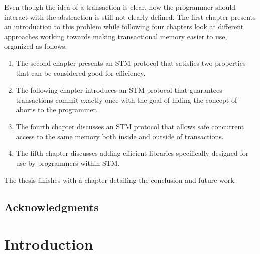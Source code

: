 \documentclass[11pt]{book}
\begin{document}
Even though the idea of a transaction is clear, how the programmer should interact with the
abstraction is still not clearly defined.
The first chapter presents an introduction to this problem
while following four chapters look at different approaches working towards
making transactional memory easier to use, organized as follows:
\begin{enumerate}
\item The second chapter presents an STM protocol that satisfies two properties that can be considered good for efficiency.
\item The following chapter introduces an STM protocol that guarantees transactions commit exactly once with the goal of hiding the concept of aborts to the programmer.
\item The fourth chapter discusses an STM protocol that allows safe concurrent access to the same memory both inside and outside of transactions.
\item The fifth chapter discusses adding efficient libraries specifically designed for use by
programmers within STM.
\end{enumerate}
The thesis finishes with a chapter detailing the conclusion and future work.



\newpage

\section*{Acknowledgments}
%

\sloppy

\tableofcontents      	%
\listoffigures        	%
\clearpage






\chapter{Introduction}
%
%

\end{document}
